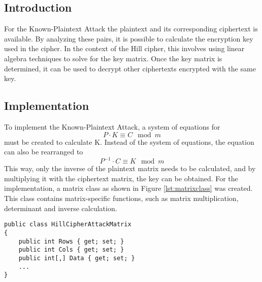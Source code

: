 \documentclass[conference]{IEEEtran}
\begin{document}
\subsection{Introduction}
For the Known-Plaintext Attack the plaintext and its corresponding ciphertext is available. By analyzing these pairs, it is possible to calculate the encryption key used in the cipher. In the context of the Hill cipher, this involves using linear algebra techniques to solve for the key matrix. Once the key matrix is determined, it can be used to decrypt other ciphertexts encrypted with the same key.
\subsection{Implementation}
To implement the Known-Plaintext Attack, a system of equations for \[P \cdot K \equiv C \mod m\] must be created to calculate K.
Instead of the system of equations, the equation can also be rearranged to \[P^{-1} \cdot C \equiv K \mod m\] This way, only the inverse\cite{b2} of the plaintext matrix needs to be calculated, and by multiplying it with the ciphertext matrix, the key can be obtained.
For the implementation, a matrix class as shown in Figure \ref{lst:matrixclass} was created. This class contains matrix-specific functions, such as matrix multiplication, determinant and inverse calculation.
\\
\begin{lstlisting}[caption={HillCipherAttackMatrix class}, label={lst:matrixclass}]
public class HillCipherAttackMatrix
{
    public int Rows { get; set; }
    public int Cols { get; set; }
    public int[,] Data { get; set; }
    ...
}
\end{lstlisting}
\end{document}
